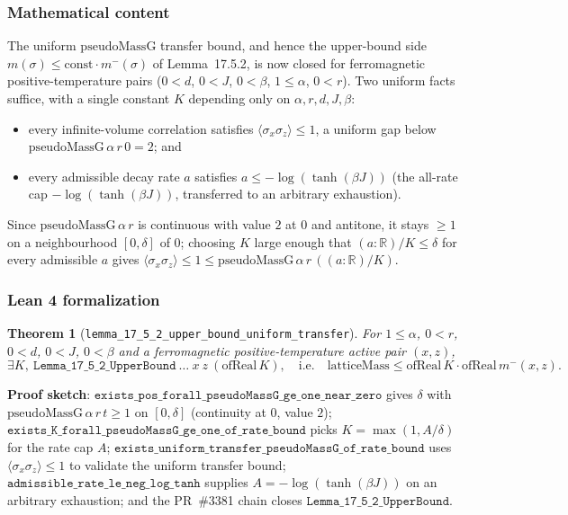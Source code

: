 \documentclass[a4paper,11pt]{article}
\newtheorem{theorem}{Theorem}
\begin{document}
\subsubsection*{Mathematical content}

The uniform $\mathrm{pseudoMassG}$ transfer bound, and hence the upper-bound side
$m(\sigma)\le\mathrm{const}\cdot m^-(\sigma)$ of Lemma~17.5.2, is now closed for
ferromagnetic positive-temperature pairs ($0<d$, $0<J$, $0<\beta$, $1\le\alpha$,
$0<r$).  Two uniform facts suffice, with a single constant $K$ depending only on
$\alpha,r,d,J,\beta$:
\begin{itemize}
\item every infinite-volume correlation satisfies
  $\langle\sigma_x\sigma_z\rangle\le 1$, a uniform gap below
  $\mathrm{pseudoMassG}\,\alpha\,r\,0=2$; and
\item every admissible decay rate $a$ satisfies $a\le -\log(\tanh(\beta J))$
  (the all-rate cap $-\log(\tanh(\beta J))$, transferred to an arbitrary exhaustion).
\end{itemize}
Since $\mathrm{pseudoMassG}\,\alpha\,r$ is continuous with value $2$ at $0$ and
antitone, it stays $\ge 1$ on a neighbourhood $[0,\delta]$ of $0$; choosing $K$
large enough that $(a:\mathbb{R})/K\le\delta$ for every admissible $a$ gives
$\langle\sigma_x\sigma_z\rangle\le 1\le\mathrm{pseudoMassG}\,\alpha\,r\,((a:\mathbb{R})/K)$.

\subsubsection*{Lean 4 formalization}

\begin{theorem}[\texttt{lemma\_17\_5\_2\_upper\_bound\_uniform\_transfer}]
For $1\le\alpha$, $0<r$, $0<d$, $0<J$, $0<\beta$ and a ferromagnetic
positive-temperature active pair $(x,z)$,
\[
  \exists K,\ \mathtt{Lemma\_17\_5\_2\_UpperBound}\ \dots\ x\ z\ (\mathrm{ofReal}\,K),
  \quad\text{i.e.}\quad
  \mathrm{latticeMass}\le\mathrm{ofReal}\,K\cdot\mathrm{ofReal}\,m^-(x,z).
\]
\end{theorem}

\noindent\textbf{Proof sketch}:
$\mathtt{exists\_pos\_forall\_pseudoMassG\_ge\_one\_near\_zero}$ gives $\delta$ with
$\mathrm{pseudoMassG}\,\alpha\,r\,t\ge 1$ on $[0,\delta]$ (continuity at $0$,
value $2$);
$\mathtt{exists\_K\_forall\_pseudoMassG\_ge\_one\_of\_rate\_bound}$ picks
$K=\max(1,A/\delta)$ for the rate cap $A$;
$\mathtt{exists\_uniform\_transfer\_pseudoMassG\_of\_rate\_bound}$ uses
$\langle\sigma_x\sigma_z\rangle\le 1$ to validate the uniform transfer bound;
$\mathtt{admissible\_rate\_le\_neg\_log\_tanh}$ supplies $A=-\log(\tanh(\beta J))$
on an arbitrary exhaustion; and the PR~\#3381 chain closes
$\mathtt{Lemma\_17\_5\_2\_UpperBound}$.
\end{document}
